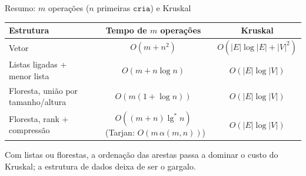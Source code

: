 \documentclass[aspectratio=169,10pt]{beamer}
\newcommand{\Cria}{\mathtt{cria}}
\newcommand{\Busca}{\mathtt{busca}}
\newcommand{\Uniao}{\mathtt{uniao}}
\newcommand{\Link}{\mathtt{link}}
\renewcommand{\lg}{\operatorname{lg}}
\newcommand{\lgs}{\lg^{*}}
\begin{document}
\begin{frame}[c]{Resumo: $m$ operações ($n$ primeiras $\Cria$) e Kruskal}

  \centering
  \renewcommand{\arraystretch}{1.4}
  \begin{tabular}{|l|c|c|}\hline
    \textbf{Estrutura} & \textbf{Tempo de $m$ operações} &
                                                           \textbf{Kruskal} \\ \hline\hline
    Vetor & $O(m+n^2)$ & $O(|E|\log|E|+|V|^2)$ \\ \hline
    Listas ligadas + menor lista & $O(m+n\log n)$ & $O(|E|\log|V|)$ \\ \hline
    Floresta, união por tamanho/altura & $O(m(1+\log n))$ &
                                                            $O(|E|\log|V|)$ \\ \hline
    Floresta, rank + compressão & $O((m+n)\lgs n)$
                                  {\scriptsize\ (Tarjan: $O(m\,\alpha(m,n))$)} & $O(|E|\log|V|)$ \\ \hline
  \end{tabular}

  \medskip\normalsize
  Com listas ou florestas, a ordenação das arestas passa a dominar o
  custo do Kruskal; a estrutura de dados deixa de ser o gargalo.
\end{frame}
\end{document}
